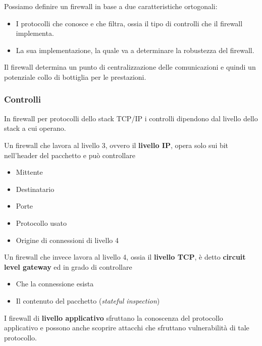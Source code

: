 Possiamo definire un firewall in base a due caratteristiche ortogonali:
\begin{itemize}
	\item I protocolli che conosce e che filtra, ossia il tipo di controlli che il firewall implementa.
	\item La sua implementazione, la quale va a determinare la robustezza del firewall.
\end{itemize}
Il firewall determina un punto di centralizzazione delle comunicazioni e quindi un potenziale collo di bottiglia per
le prestazioni.

\subsubsection{Controlli}
In firewall per protocolli dello stack TCP/IP i controlli dipendono dal livello dello stack a cui operano.

Un firewall che lavora al livello 3, ovvero il \textbf{livello IP}, opera solo sui bit nell'header del pacchetto e può
controllare
\begin{itemize}
	\item Mittente
	\item Destinatario
	\item Porte
	\item Protocollo usato
	\item Origine di connessioni di livello 4
\end{itemize}
Un firewall che invece lavora al livello 4, ossia il \textbf{livello TCP}, è detto \textbf{circuit level gateway} ed in
grado di controllare
\begin{itemize}
	\item Che la connessione esista
	\item Il contenuto del pacchetto (\emph{stateful inspection})
\end{itemize}
I firewall di \textbf{livello applicativo} sfruttano la conoscenza del protocollo applicativo e possono anche scoprire
attacchi che sfruttano vulnerabilità di tale protocollo.

